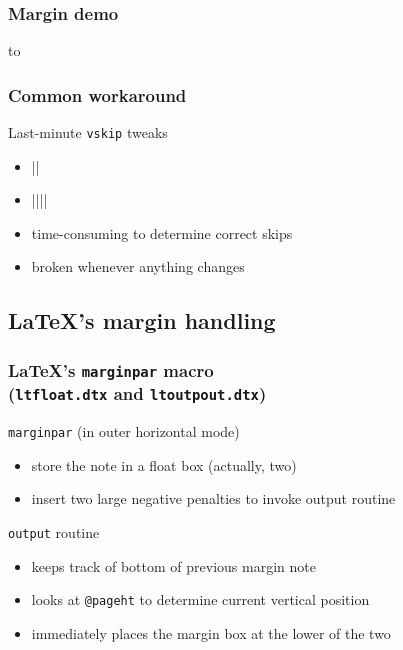 \documentclass{beamer}
\def\cs#1{\texttt{\expandafter\string\csname#1\endcsname}}
\begin{document}
\begin{frame}
  \frametitle{Margin demo}
  \hbox to \textwidth{\hfill\Huge$\Uparrow$\hfill}
\end{frame}

\begin{frame}[fragile]
  \frametitle{Common workaround}
  \begin{block}{Last-minute \cs{vskip} tweaks}
    \begin{itemize}
    \item |\marginpar{|{\color{red}|\vskip-30pc|}\ldots|}|
    \item {\color{red}||}|\marginpar{|\ldots|}|
    \item time-consuming to determine correct skips
    \item broken whenever anything changes
    \end{itemize}
  \end{block}
\end{frame}

\subsection{\protect\LaTeX's margin handling}
\begin{frame}
  \frametitle{\LaTeX's \cs{marginpar} macro\\\normalsize
  (\texttt{ltfloat.dtx} and \texttt{ltoutpout.dtx})}
  \begin{block}{\cs{marginpar} (in outer horizontal mode)}
    \begin{itemize}
    \item store the note in a float box (actually, two)
    \item insert two large negative penalties to invoke output routine
    \end{itemize}
  \end{block}
  \begin{block}{\cs{output} routine}
    \begin{itemize}
    \item keeps track of bottom of previous margin note
    \item looks at \cs{@pageht} to determine current vertical position
    \item immediately places the margin box at the lower of the two
    \end{itemize}
  \end{block}
\end{frame}
 
\end{document}
